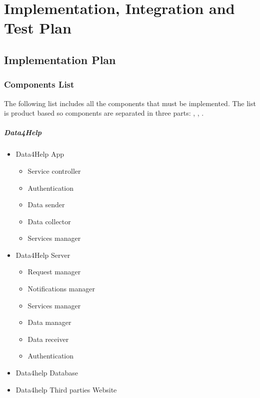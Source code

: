
 \chapter{Implementation, Integration and Test Plan}
	\section{Implementation Plan}

		\subsection{Components List}
			The following list includes all the components that must be implemented. The list is product based so components are separated in three parts: , , . 
			\paragraph{Data4Help}
			\begin{itemize}
				\item{Data4Help App}
					\begin{itemize}
						\item{Service controller}
						\item{Authentication}
						\item{Data sender}
						\item{Data collector}
						\item{Services manager}
					\end{itemize}
				\item{Data4Help Server}
					\begin{itemize}
						\item{Request manager}
						\item{Notifications manager}
						\item{Services manager}
						\item{Data manager}
						\item{Data receiver}
						\item{Authentication}
					\end{itemize}
				\item{Data4help Database}
				\item{Data4help Third parties Website}
			\end{itemize}
